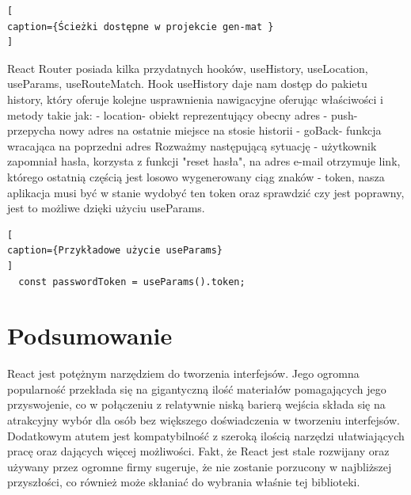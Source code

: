 \documentclass[oneside,polski,logo,indent]{amuthesis}
\begin{document}
\begin{enumerate}
\begin{enumerate}
\begin{lstlisting}[
caption={Ścieżki dostępne w projekcie gen-mat }
]
\end{lstlisting}

React Router posiada kilka przydatnych hooków, useHistory, useLocation, useParams, useRouteMatch. Hook useHistory daje nam dostęp do pakietu history, który oferuje kolejne usprawnienia 
nawigacyjne oferując właściwości i metody takie jak:
\newline - location- obiekt reprezentujący obecny adres
\newline - push- przepycha nowy adres na ostatnie miejsce na stosie historii
\newline - goBack- funkcja wracająca na poprzedni adres
\newline
Rozważmy następującą sytuację - użytkownik zapomniał hasła, korzysta z funkcji "reset hasła", na adres e-mail otrzymuje link, którego ostatnią częścią
jest losowo wygenerowany ciąg znaków - token, nasza aplikacja musi być w stanie wydobyć ten token oraz sprawdzić czy jest poprawny, jest to możliwe dzięki użyciu useParams.
\begin{lstlisting}[
caption={Przykładowe użycie useParams}
]
  const passwordToken = useParams().token;

\end{lstlisting}




\pagebreak

\section{Podsumowanie}
React jest potężnym narzędziem do tworzenia interfejsów. Jego ogromna popularność przekłada się na gigantyczną ilość materiałów pomagających jego przyswojenie, co w połączeniu z relatywnie niską barierą wejścia składa się na atrakcyjny wybór dla osób bez większego doświadczenia w tworzeniu interfejsów.
Dodatkowym atutem jest kompatybilność z szeroką ilością narzędzi ułatwiających pracę oraz dających więcej możliwości. Fakt, że React jest stale rozwijany oraz używany przez ogromne firmy
sugeruje, że nie zostanie porzucony w najbliższej przyszłości, co również może skłaniać do wybrania właśnie tej biblioteki.



\printbibliography

\end{enumerate}
\end{enumerate}
\end{document}
